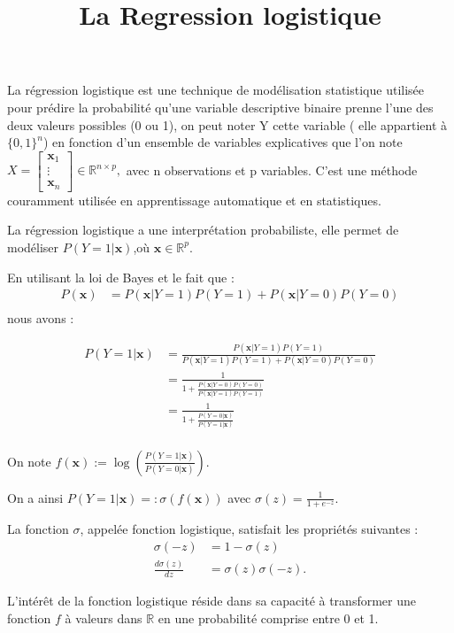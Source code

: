 \documentclass{article}
\title{La Regression logistique}
\begin{document}
\maketitle


La régression logistique est une technique de modélisation statistique utilisée pour prédire la probabilité qu'une variable descriptive binaire prenne l'une des deux valeurs possibles (0 ou 1), on peut noter Y cette variable ( elle appartient à $\{0, 1\}^n$) en fonction d'un ensemble de variables explicatives que l'on note $X = \begin{bmatrix} \bm{x}_1 \\ \vdots \\ \bm{x}_n \end{bmatrix} \in \mathbb{R}^{n \times p},
$ avec n observations et p variables. C'est une méthode couramment utilisée en apprentissage automatique et en statistiques.

La régression logistique a une interprétation probabiliste, elle permet de modéliser $P(Y = 1 | \bm{x})$,où $\bm{x}\in \mathbb{R}^{p}$.

En utilisant la loi de Bayes et le fait que : 
\begin{align*}
    P(\bm{x}) &= P(\bm{x}|Y=1)P(Y=1) + P(\bm{x}|Y=0)P(Y=0) \\
\end{align*}
nous avons :

\begin{align*}
P(Y=1|\bm{x}) &= \frac{P(\bm{x}|Y=1)P(Y=1)}{P(\bm{x}|Y=1)P(Y=1) + P(\bm{x}|Y=0)P(Y=0)} \\
&= \frac{1}{1 + \frac{P(\bm{x}|Y=0)P(Y=0)}{P(\bm{x}|Y=1)P(Y=1)}} \\
&= \frac{1}{1 + \frac{P(Y=0|\bm{x})}{P(Y=1|\bm{x})}} \\
\end{align*}

On note $f(\bm{x}) := \log\left(\frac{P(Y=1|\bm{x})}{P(Y=0|\bm{x})}\right)$.


On a ainsi \( P(Y=1|\bm{x}) =: \sigma(f(\bm{x})) \) avec \( \sigma(z) = \frac{1}{1 + e^{-z}} \).

La fonction \( \sigma \), appelée fonction logistique, satisfait les propriétés suivantes :
\begin{align*}
    \sigma(-z) &= 1 - \sigma(z) \\
    \frac{d\sigma(z)}{dz} &= \sigma(z) \sigma(-z).
\end{align*}

L'intérêt de la fonction logistique réside dans sa capacité à transformer une fonction \( f \) à valeurs dans \( \mathbb{R} \) en une probabilité comprise entre 0 et 1.
\end{document}
